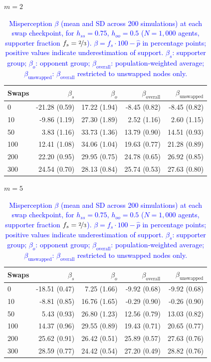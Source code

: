 \begin{table}[H]
\centering
\caption{\textcolor{blue}{Misperception $\beta$ (mean and SD across 200 simulations) at each swap checkpoint, for $h_{ss} = 0.75$, $h_{oo} = 0.5$ ($N = 1{,}000$ agents, supporter fraction $f_s = \nicefrac{2}{3}$). $\beta = f_s \cdot 100 - \hat{p}$ in percentage points; positive values indicate underestimation of support. $\beta_s$: supporter group; $\beta_o$: opponent group; $\beta_{\mathrm{overall}}$: population-weighted average; $\beta_{\mathrm{unswapped}}$: $\beta_{\mathrm{overall}}$ restricted to unswapped nodes only.}}
\label{tab:subset_fs0667_hss750_hoo500}
\par\medskip
\noindent\textit{$m = 2$}\\[2pt]
\begin{tabular}{l rrrr}
\toprule
Swaps & $\beta_s$ & $\beta_o$ & $\beta_{\mathrm{overall}}$ & $\beta_{\mathrm{unswapped}}$ \\
\midrule
0 & -21.28 (0.59) & 17.22 (1.94) & -8.45 (0.82) & -8.45 (0.82) \\
10 & -9.86 (1.19) & 27.30 (1.89) & 2.52 (1.16) & 2.60 (1.15) \\
50 & 3.83 (1.16) & 33.73 (1.36) & 13.79 (0.90) & 14.51 (0.93) \\
100 & 12.41 (1.08) & 34.06 (1.04) & 19.63 (0.77) & 21.28 (0.89) \\
200 & 22.20 (0.95) & 29.95 (0.75) & 24.78 (0.65) & 26.92 (0.85) \\
300 & 24.54 (0.70) & 28.13 (0.84) & 25.74 (0.53) & 27.63 (0.80) \\
\bottomrule
\end{tabular}
\par\medskip
\noindent\textit{$m = 5$}\\[2pt]
\begin{tabular}{l rrrr}
\toprule
Swaps & $\beta_s$ & $\beta_o$ & $\beta_{\mathrm{overall}}$ & $\beta_{\mathrm{unswapped}}$ \\
\midrule
0 & -18.51 (0.47) & 7.25 (1.66) & -9.92 (0.68) & -9.92 (0.68) \\
10 & -8.81 (0.85) & 16.76 (1.65) & -0.29 (0.90) & -0.26 (0.90) \\
50 & 5.43 (0.93) & 26.80 (1.23) & 12.56 (0.79) & 13.03 (0.82) \\
100 & 14.37 (0.96) & 29.55 (0.89) & 19.43 (0.71) & 20.65 (0.77) \\
200 & 25.62 (0.91) & 26.42 (0.51) & 25.89 (0.57) & 27.63 (0.76) \\
300 & 28.59 (0.77) & 24.42 (0.54) & 27.20 (0.49) & 28.82 (0.76) \\

\end{tabular}
\end{table}
